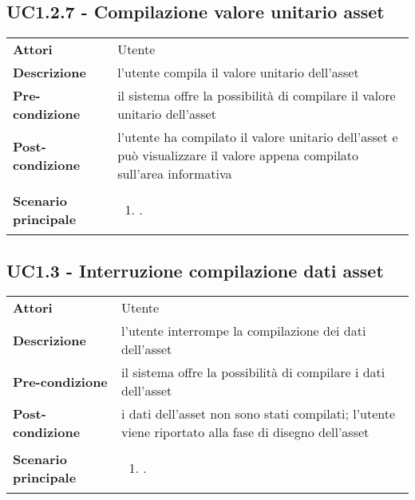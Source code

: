 \subsection{UC1.2.7 - Compilazione valore unitario asset} 
\label{sssec:UC1.2.7} 
\def\arraystretch{1.5}
\begin{tabularx}{\textwidth}{l|p{}}
	\rowcolor{I} \multicolumn{2}{c}{\color{white}\textbf{UC1.2.7 - Compilazione valore unitario asset}} \\
	\toprule
	\endhead
	\textbf{Attori} & Utente\\
	\textbf{Descrizione} & l'utente compila il valore unitario dell'asset\\
	\textbf{Pre-condizione} & il sistema offre la possibilità di compilare il valore unitario dell'asset\\
	\textbf{Post-condizione} & l'utente ha compilato il valore unitario dell'asset e può visualizzare il valore appena compilato sull'area informativa\\
	\textbf{Scenario principale} & \vspace{-1.2em}\begin{enumerate}[leftmargin=*,noitemsep,nosep]
		\item \nameref{sssec:UC1.2.7}.
	\end{enumerate}\\
	\bottomrule
\end{tabularx}
\subsection{UC1.3 - Interruzione compilazione dati asset} 
\label{sssec:UC1.3} 
\def\arraystretch{1.5}
\begin{tabularx}{\textwidth}{l|p{}}
	\rowcolor{I} \multicolumn{2}{c}{\color{white}\textbf{UC1.3 - Interruzione compilazione dati asset}} \\
	\toprule
	\endhead
	\textbf{Attori} & Utente\\
	\textbf{Descrizione} & l'utente interrompe la compilazione dei dati dell'asset\\
	\textbf{Pre-condizione} & il sistema offre la possibilità di compilare i dati dell'asset\\
	\textbf{Post-condizione} & i dati dell'asset non sono stati compilati; l'utente viene riportato alla fase di disegno dell'asset\\
	\textbf{Scenario principale} & \vspace{-1.2em}\begin{enumerate}[leftmargin=*,noitemsep,nosep]
		\item \nameref{sssec:UC1.3}.
	\end{enumerate}\\
	\bottomrule
\end{tabularx}
